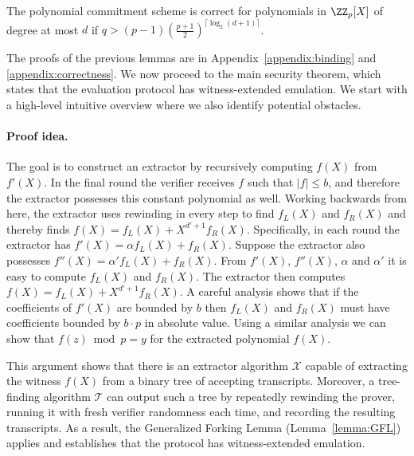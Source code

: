 \newcommand{\correctnesslemma}{
The polynomial commitment scheme is correct for polynomials in $\ZZ_p[X]$ of degree at most $d$ if $q> (p-1) (\frac{p+1}{2})^{\lceil \log_2(d+1)\rceil}$.
}
 
 \begin{lemma}
 	\label{lem:correctness}
\correctnesslemma
 \end{lemma}


The proofs of the previous lemmas are in Appendix~\ref{appendix:binding} and \ref{appendix:correctness}.
We now proceed to the main security theorem, which states that the evaluation protocol has witness-extended emulation. We start with a high-level intuitive overview where we also identify potential obstacles.

\paragraph{Proof idea.} %
The goal is to construct an extractor by recursively computing $f(X)$ from $f'(X)$. In the final round the verifier receives $f$ such that $|f| \leq b$, and therefore the extractor possesses this constant polynomial as well. Working backwards from here, the extractor uses rewinding in every step to find $f_L(X)$ and $f_R(X)$ and thereby finds $f(X) = f_L(X) + X^{d'+1}f_R(X)$.
Specifically, in each round the extractor has $f'(X)=\alpha f_L(X)+ f_R(X)$. Suppose the extractor also possesses $f''(X)=\alpha' f_L(X)+ f_R(X)$. From $f'(X)$, $f''(X)$, $\alpha$ and $\alpha'$ it is easy to compute $f_L(X)$ and $f_R(X)$. The extractor then computes $f(X)=f_L(X)+X^{d'+1} f_R(X)$.
A careful analysis shows that if the coefficients of $f'(X)$ are bounded by $b$ then $f_L(X)$ and $f_R(X)$ must have coefficients bounded by $b \cdot p$ in absolute value. Using a similar analysis we can show that $f(z)\bmod p=y$ for the extracted polynomial $f(X)$.

This argument shows that there is an extractor algorithm $\mathcal{X}$ capable of extracting the witness $f(X)$ from a binary tree of accepting transcripts. Moreover, a tree-finding algorithm $\mathcal{T}$ can output such a tree by repeatedly rewinding the prover, running it with fresh verifier randomness each time, and recording the resulting transcripts. As a result, the Generalized Forking Lemma (Lemma~\ref{lemma:GFL}) applies and establishes that the protocol has witness-extended emulation.

